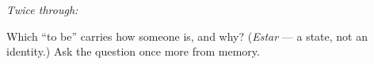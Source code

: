 \emph{Twice through:}

\begin{tcolorbox}[breakable,colback=teal!4,colframe=teal!35!black,title={Before you move on}]
Which \textquotedblleft{}to be\textquotedblright{} carries how someone is, and why? (\emph{Estar} — a state, not an identity.) Ask the question once more from memory.
\end{tcolorbox}
